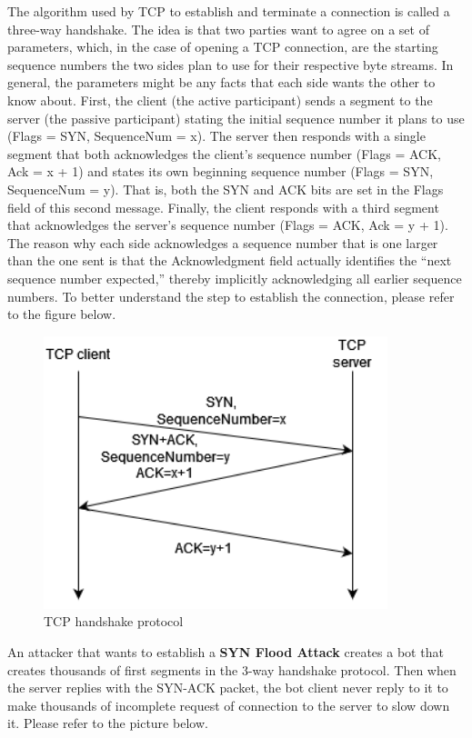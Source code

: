 The algorithm used by TCP to establish and terminate a connection is called a three-way handshake.
The idea is that two parties want to agree on a set of parameters, which, in the case of opening a TCP connection, are the starting sequence numbers the two sides plan to use for their respective byte streams. In general, the parameters might be any facts that each side wants the other to know about. First, the client (the active participant) sends a segment to the server (the passive participant) stating the initial sequence number it plans to use (Flags = SYN, SequenceNum = x). The server then responds with a single segment that both acknowledges the client's sequence number (Flags = ACK, Ack = x + 1) and states its own beginning sequence number (Flags = SYN, SequenceNum = y). That is, both the SYN and ACK bits are set in the Flags field of this second message. Finally, the client responds with a third segment that acknowledges the server's sequence number (Flags = ACK, Ack = y + 1). The reason why each side acknowledges a sequence number that is one larger than the one sent is that the Acknowledgment field actually identifies the “next sequence number expected,” thereby implicitly acknowledging all earlier sequence numbers.
To better understand the step to establish the connection, please refer to the figure below.
\begin{figure}[h!]
\centering
\includegraphics[width = 10cm]{images/TCP3wayHANDSHAKE.drawio.png}
\caption{TCP handshake protocol}
\label{fig:TCP}
\end{figure}
\FloatBarrier
\noindent

An attacker that wants to establish a \textbf{SYN Flood Attack} creates a bot that creates thousands of first segments in the 3-way handshake protocol. Then when the server replies with the SYN-ACK packet, the bot client never reply to it to make thousands of incomplete request of connection to the server to slow down it. Please refer to the picture below.

